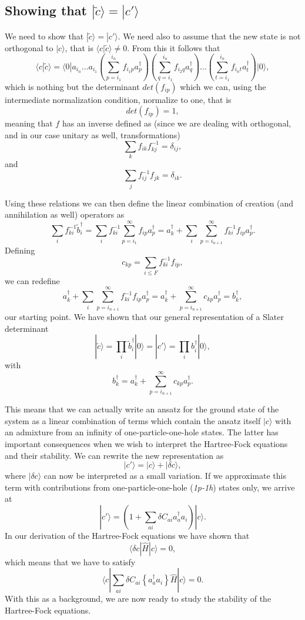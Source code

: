 \documentclass[graybox,sectrefs,envcountresetchap,open=right]{svmonodo}
\begin{document}
\subsection{Showing that $|\tilde{c}\rangle= |c'\rangle$}



We need to show that $|\tilde{c}\rangle= |c'\rangle$. We need also to assume that the new state
is not orthogonal to $|c\rangle$, that is $\langle c| \tilde{c}\rangle \ne 0$. From this it follows that 
\[
\langle c| \tilde{c}\rangle=\langle 0| a_{i_n}\dots a_{i_1}\left(\sum_{p=i_1}^{i_n}f_{i_1p}a_{p}^{\dagger} \right)\left(\sum_{q=i_1}^{i_n}f_{i_2q}a_{q}^{\dagger} \right)\dots \left(\sum_{t=i_1}^{i_n}f_{i_nt}a_{t}^{\dagger} \right)|0\rangle,
\]
which is nothing but the determinant $det(f_{ip})$ which we can, using the intermediate normalization condition, 
normalize to one, that is
\[
det(f_{ip})=1,
\]
meaning that $f$ has an inverse defined as (since we are dealing with orthogonal, and in our case unitary as well, transformations)
\[
\sum_{k} f_{ik}f^{-1}_{kj} = \delta_{ij},
\]
and 
\[
\sum_{j} f^{-1}_{ij}f_{jk} = \delta_{ik}.
\]




Using these relations we can then define the linear combination of creation (and annihilation as well) 
operators as
\[
\sum_{i}f^{-1}_{ki}\tilde{b}^{\dagger}_{i}=\sum_{i}f^{-1}_{ki}\sum_{p=i_1}^{\infty}f_{ip}a_{p}^{\dagger}=a_{k}^{\dagger}+\sum_{i}\sum_{p=i_{n+1}}^{\infty}f^{-1}_{ki}f_{ip}a_{p}^{\dagger}.
\]
Defining 
\[
c_{kp}=\sum_{i \le F}f^{-1}_{ki}f_{ip},
\]
we can redefine 
\[
a_{k}^{\dagger}+\sum_{i}\sum_{p=i_{n+1}}^{\infty}f^{-1}_{ki}f_{ip}a_{p}^{\dagger}=a_{k}^{\dagger}+\sum_{p=i_{n+1}}^{\infty}c_{kp}a_{p}^{\dagger}=b_k^{\dagger},
\]
our starting point. We have shown that our general representation of a Slater determinant 
\[
|\tilde{c}\rangle=\prod_{i}\tilde{b}^{\dagger}_{i}|0\rangle=|c'\rangle=\prod_{i}b^{\dagger}_{i}|0\rangle,
\]
with 
\[
b_k^{\dagger}=a_{k}^{\dagger}+\sum_{p=i_{n+1}}^{\infty}c_{kp}a_{p}^{\dagger}.
\]




This means that we can actually write an ansatz for the ground state of the system as a linear combination of
terms which contain the ansatz itself $|c\rangle$ with  an admixture from an infinity of one-particle-one-hole states. The latter has important consequences when we wish to interpret the Hartree-Fock equations and their stability. We can rewrite the new representation as 
\[
|c'\rangle = |c\rangle+|\delta c\rangle,
\]
where $|\delta c\rangle$ can now be interpreted as a small variation. If we approximate this term with 
contributions from one-particle-one-hole (\emph{1p-1h}) states only, we arrive at 
\[
|c'\rangle = \left(1+\sum_{ai}\delta C_{ai}a_{a}^{\dagger}a_i\right)|c\rangle.
\]
In our derivation of the Hartree-Fock equations we have shown that 
\[
\langle \delta c| \hat{H} | c\rangle =0,
\]
which means that we have to satisfy
\[
\langle c|\sum_{ai}\delta C_{ai}\left\{a_{a}^{\dagger}a_i\right\} \hat{H} | c\rangle =0.
\]
With this as a background, we are now ready to study the stability of the Hartree-Fock equations.
\end{document}
